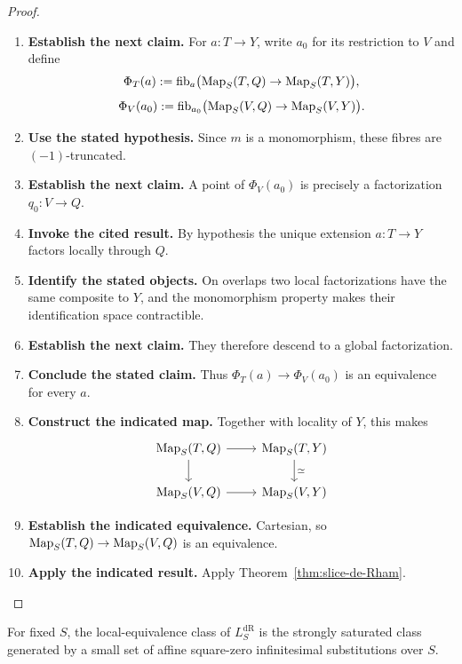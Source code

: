 \begin{proof}
\leavevmode
\begin{enumerate}[label=\textup{(\arabic*)}]
    \item \textbf{Establish the next claim.}
    For \(a:T\to Y\), write \(a_0\) for its restriction to \(V\) and define
    \[
    \Phi_T(a)
    :=
    \operatorname{fib}_a
    \bigl(\operatorname{Map}_S(T,Q)\to\operatorname{Map}_S(T,Y)\bigr),
    \]
    \[
    \Phi_V(a_0)
    :=
    \operatorname{fib}_{a_0}
    \bigl(\operatorname{Map}_S(V,Q)\to\operatorname{Map}_S(V,Y)\bigr).
    \]
    \item \textbf{Use the stated hypothesis.}
    Since \(m\) is a monomorphism, these fibres are \((-1)\)-truncated.
    \item \textbf{Establish the next claim.}
    A point of
    \(\Phi_V(a_0)\) is precisely a factorization \(q_0:V\to Q\).
    \item \textbf{Invoke the cited result.}
    By hypothesis the
    unique extension \(a:T\to Y\) factors locally through \(Q\).
    \item \textbf{Identify the stated objects.}
    On overlaps two local
    factorizations have the same composite to \(Y\), and the monomorphism property makes their
    identification space contractible.
    \item \textbf{Establish the next claim.}
    They therefore descend to a global factorization.
    \item \textbf{Conclude the stated claim.}
    Thus \(\Phi_T(a)\to\Phi_V(a_0)\) is an equivalence for every \(a\).
    \item \textbf{Construct the indicated map.}
    Together
    with locality of \(Y\), this makes
    \[
    \begin{tikzcd}
    \Map_S(T,Q) \ar[r] \ar[d] & \Map_S(T,Y) \ar[d,"\simeq"]\\
    \Map_S(V,Q) \ar[r] & \Map_S(V,Y)
    \end{tikzcd}
    \]
    \item \textbf{Establish the indicated equivalence.}
    Cartesian, so \(\operatorname{Map}_S(T,Q)\to\operatorname{Map}_S(V,Q)\) is an equivalence.
    \item \textbf{Apply the indicated result.}
    Apply
    Theorem~\ref{thm:slice-de-Rham}.
\end{enumerate}
\end{proof}

\begin{proposition}
\label{prop:relative-de-Rham-generated-squarezero}
For fixed \(S\), the local-equivalence class of \(L^{\mathrm{dR}}_S\) is the
strongly saturated class generated by a small set of affine square-zero
infinitesimal substitutions over \(S\).
\end{proposition}


